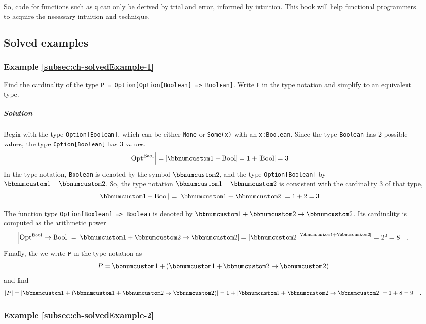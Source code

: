 So, code for functions such as \lstinline!q! can only be derived
by trial and error, informed by intuition. This book will help functional
programmers to acquire the necessary intuition and technique.

\subsection{Solved examples}

\subsubsection{Example \label{subsec:ch-solvedExample-1}\ref{subsec:ch-solvedExample-1}}

Find the cardinality of the type \lstinline!P = Option[Option[Boolean] => Boolean]!.
Write \lstinline!P! in the type notation and simplify to an equivalent
type.

\subparagraph{Solution}

Begin with the type \lstinline!Option[Boolean]!, which can be either
\lstinline!None! or \lstinline!Some(x)! with an \lstinline!x:Boolean!.
Since the type \lstinline!Boolean! has $2$ possible values, the
type \lstinline!Option[Boolean]! has $3$ values:
\[
\left|\text{Opt}^{\text{Bool}}\right|=\left|\bbnum 1+\text{Bool}\right|=1+\left|\text{Bool}\right|=3\quad.
\]
In the type notation, \lstinline!Boolean! is denoted by the symbol
$\bbnum 2$, and the type \lstinline!Option[Boolean]! by $\bbnum 1+\bbnum 2$.
So, the type notation $\bbnum 1+\bbnum 2$ is consistent with the
cardinality $3$ of that type,
\[
\left|\bbnum 1+\text{Bool}\right|=\left|\bbnum 1+\bbnum 2\right|=1+2=3\quad.
\]

The function type \lstinline!Option[Boolean] => Boolean! is denoted
by $\bbnum 1+\bbnum 2\rightarrow\bbnum 2$. Its cardinality is computed
as the arithmetic power 
\[
\left|\text{Opt}^{\text{Bool}}\rightarrow\text{Bool}\right|=\left|\bbnum 1+\bbnum 2\rightarrow\bbnum 2\right|=\left|\bbnum 2\right|^{\left|\bbnum 1+\bbnum 2\right|}=2^{3}=8\quad.
\]
Finally, the we write \lstinline!P! in the type notation as 
\[
P=\bbnum 1+\left(\bbnum 1+\bbnum 2\rightarrow\bbnum 2\right)
\]
and find 
\[
\left|P\right|=\left|\bbnum 1+\left(\bbnum 1+\bbnum 2\rightarrow\bbnum 2\right)\right|=1+\left|\bbnum 1+\bbnum 2\rightarrow\bbnum 2\right|=1+8=9\quad.
\]


\subsubsection{Example \label{subsec:ch-solvedExample-2}\ref{subsec:ch-solvedExample-2}}

